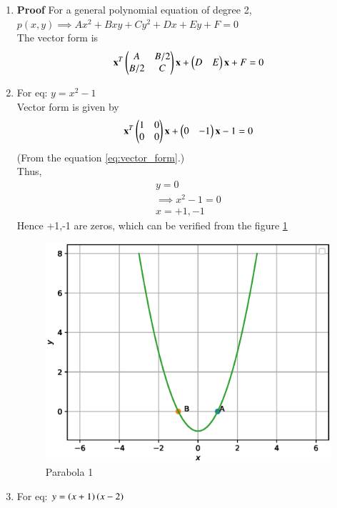 \renewcommand{\theequation}{\theenumi}
\begin{enumerate}[label=\arabic*.,ref=\thesubsubsection.\theenumi]
\item \textbf{Proof} For a general polynomial equation of degree 2,
\\
$p(x,y) \implies Ax^2+Bxy+Cy^2+Dx+Ey+F=0$
\\
The vector form is 
\begin{align}
\label{eq:vector_form}
\mathbf{x}^T \begin{pmatrix}A & B/2\\B/2 & C\end{pmatrix}\mathbf{x}+ \begin{pmatrix}D & E\end{pmatrix}\mathbf{x}+F=0
\end{align}
\item For eq: $ y = x^2 - 1$
\\
Vector form is given by
\begin{align}
\mathbf{x}^T \begin{pmatrix}1 & 0\\0 & 0\end{pmatrix}\mathbf{x}+\begin{pmatrix}0 & -1\end{pmatrix}\mathbf{x}-1=0
\end{align}
(From the equation \ref{eq:vector_form}.)
\\
Thus,
\begin{align}
y=0
\\
\implies x^2-1=0
\\
x=+1,-1
\end{align}
Hence +1,-1 are zeros, which can be verified from the figure \ref{fig:parab1}
\begin{figure}[!ht]
\includegraphics[width=\columnwidth]{./figs/conics/parabola1.eps}
\caption{Parabola 1}
\label{fig:parab1}
\end{figure}
\item For eq: $ y = \left(x+1\right) \left(x-2\right)$

\end{enumerate}

